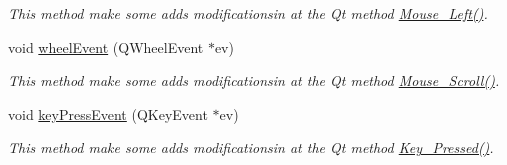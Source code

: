 \begin{DoxyCompactItemize}
\begin{DoxyCompactList}\small\item\em This method make some adds modificationsin at the Qt method \hyperlink{classQCustomLabel_ae5fe8fd62adb9568cfa6d412d6a62948}{Mouse\-\_\-\-Left()}. \end{DoxyCompactList}\item 
void \hyperlink{classQCustomLabel_ae7a4aaaf4f56d95199d1279923d7ff92}{wheel\-Event} (Q\-Wheel\-Event $\ast$ev)
\begin{DoxyCompactList}\small\item\em This method make some adds modificationsin at the Qt method \hyperlink{classQCustomLabel_aea283ddc963d921271109be3bcb82b6f}{Mouse\-\_\-\-Scroll()}. \end{DoxyCompactList}\item 
\hypertarget{classQCustomLabel_a38e4ecf9b9298636b36594cdbace5260}{void \hyperlink{classQCustomLabel_a38e4ecf9b9298636b36594cdbace5260}{key\-Press\-Event} (Q\-Key\-Event $\ast$ev)}\label{classQCustomLabel_a38e4ecf9b9298636b36594cdbace5260}

\begin{DoxyCompactList}\small\item\em This method make some adds modificationsin at the Qt method \hyperlink{classQCustomLabel_a8c48808fd1d4287bf220df16f7c2feb5}{Key\-\_\-\-Pressed()}. \end{DoxyCompactList}\end{DoxyCompactItemize}
